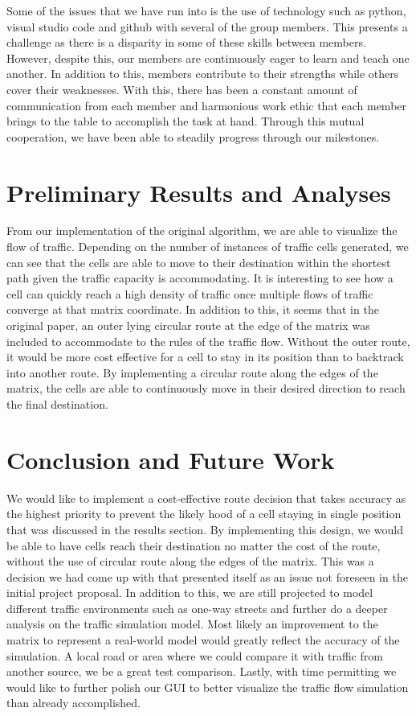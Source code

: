 \documentclass[sigplan,screen]{acmart}
\begin{document}
Some of the issues that we have run into is the use of technology such as
python, visual studio code and github with several of the group members. This
presents a challenge as there is a disparity in some of these skills between
members. However, despite this, our members are continuously eager to learn and
teach one another. In addition to this, members contribute to their strengths
while others cover their weaknesses. With this, there has been a constant amount
of communication from each member and harmonious work ethic that each member
brings to the table to accomplish the task at hand. Through this mutual
cooperation, we have been able to steadily progress through our milestones.  

\section{Preliminary Results and Analyses}
From our implementation of the original algorithm, we are able to visualize the
flow of traffic. Depending on the number of instances of traffic cells
generated, we can see that the cells are able to move to their destination
within the shortest path given the traffic capacity is accommodating. It is
interesting to see how a cell can quickly reach a high density of traffic once
multiple flows of traffic converge at that matrix coordinate. In addition to
this, it seems that in the original paper, an outer lying circular route at the
edge of the matrix was included to accommodate to the rules of the traffic flow.
Without the outer route, it would be more cost effective for a cell to stay in
its position than to backtrack into another route. By implementing a circular
route along the edges of the matrix, the cells are able to continuously move in
their desired direction to reach the final destination.  

\section{Conclusion and Future Work}
We would like to implement a cost-effective route decision that takes accuracy
as the highest priority to prevent the likely hood of a cell staying in single
position that was discussed in the results section. By implementing this design,
we would be able to have cells reach their destination no matter the cost of the
route, without the use of circular route along the edges of the matrix. This was
a decision we had come up with that presented itself as an issue not foreseen in
the initial project proposal. In addition to this, we are still projected to
model different traffic environments such as one-way streets and further do a
deeper analysis on the traffic simulation model. Most likely an improvement to
the matrix to represent a real-world model would greatly reflect the accuracy of
the simulation. A local road or area where we could compare it with traffic from
another source, we be a great test comparison. Lastly, with time permitting we
would like to further polish our GUI to better visualize the traffic flow
simulation than already accomplished.  



\end{document}
